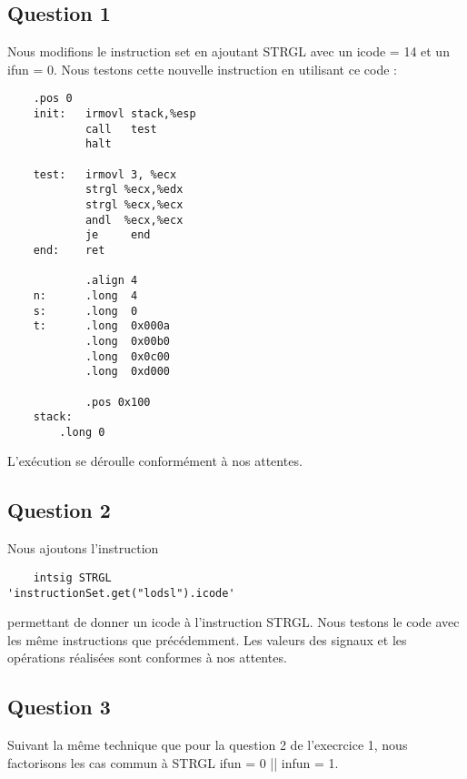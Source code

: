 \documentclass[a4paper,10pt]{article}
\begin{document}
\subsection{Question 1}
Nous modifions le instruction set en ajoutant STRGL avec un icode = 14 et un ifun = 0.
Nous testons cette nouvelle instruction en utilisant ce code :
\begin{verbatim}
    .pos 0
    init:   irmovl stack,%esp
            call   test
            halt

    test:   irmovl 3, %ecx
            strgl %ecx,%edx
            strgl %ecx,%ecx
            andl  %ecx,%ecx
            je     end
    end:    ret

            .align 4
    n:      .long  4
    s:      .long  0
    t:      .long  0x000a
            .long  0x00b0
            .long  0x0c00
            .long  0xd000

            .pos 0x100
    stack:
        .long 0

\end{verbatim}
L'exécution se déroulle conformément à nos attentes.

\subsection{Question 2}
Nous ajoutons l'instruction
\begin{verbatim}
    intsig STRGL                    'instructionSet.get("lodsl").icode'
\end{verbatim}
permettant de donner un icode à l'instruction STRGL.
Nous testons le code avec les même instructions que précédemment. Les valeurs des signaux et les opérations réalisées sont conformes à nos attentes.

\subsection{Question 3}
Suivant la même technique que pour la question 2 de l'execrcice 1, nous factorisons les cas commun à STRGL ifun = 0 || infun = 1.
\end{document}
